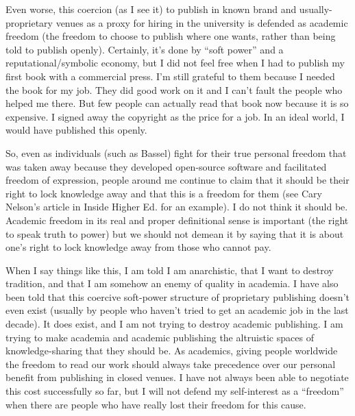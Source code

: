Even worse, this coercion (as I see it) to publish in known brand and
usually-proprietary venues as a proxy for hiring in the university is
defended as academic freedom (the freedom to choose to publish where one
wants, rather than being told to publish openly). Certainly, it's done
by ``soft power'' and a reputational/symbolic economy, but I did not
feel free when I had to publish my first book with a commercial press.
I'm still grateful to them because I needed the book for my job. They
did good work on it and I can't fault the people who helped me there.
But few people can actually read that book now because it is so
expensive. I signed away the copyright as the price for a job. In an
ideal world, I would have published this openly.

So, even as individuals (such as Bassel) fight for their true personal
freedom that was taken away because they developed open-source software
and facilitated freedom of expression, people around me continue to
claim that it should be their right to lock knowledge away and that this
is a freedom for them (see Cary Nelson's article in Inside Higher Ed.
for an example). I do not think it should be. Academic freedom in its
real and proper definitional sense is important (the right to speak
truth to power) but we should not demean it by saying that it is about
one's right to lock knowledge away from those who cannot pay.

When I say things like this, I am told I am anarchistic, that I want to
destroy tradition, and that I am somehow an enemy of quality in
academia. I have also been told that this coercive soft-power structure
of proprietary publishing doesn't even exist (usually by people who
haven't tried to get an academic job in the last decade). It does exist,
and I am not trying to destroy academic publishing. I am trying to make
academia and academic publishing the altruistic spaces of
knowledge-sharing that they should be. As academics, giving people
worldwide the freedom to read our work should always take precedence
over our personal benefit from publishing in closed venues. I have not
always been able to negotiate this cost successfully so far, but I will
not defend my self-interest as a ``freedom'' when there are people who
have really lost their freedom for this cause.
